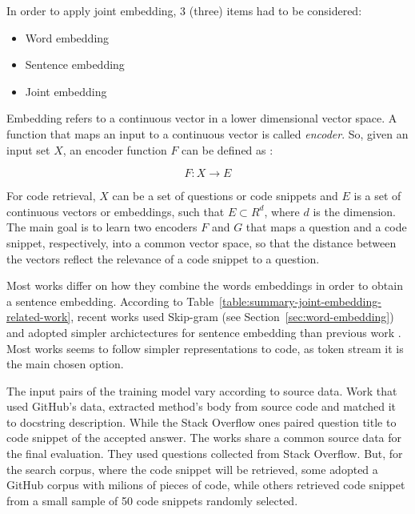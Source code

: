 \documentclass[sigconf]{acmart}
\begin{document}
In order to apply joint embedding, 3 (three) items had to be considered:

\begin{itemize}
    \item Word embedding
    \item Sentence embedding
    \item Joint embedding
\end{itemize}

Embedding refers to a continuous vector in a lower dimensional vector space. A function that maps an input to a continuous vector is called \emph{encoder}. So, given an input set $X$, an encoder function $F$ can be defined as \cite{cambronero-deep-code-search-2019}:

\begin{equation}
    F: X \to E
\end{equation}

For code retrieval, $X$ can be a set of questions or code snippets and $E$ is a set of continuous vectors or embeddings, such that $E \subset R^{d}$, where $d$ is the dimension. The main goal is to learn two encoders $F$ and $G$ that maps a question and a code snippet, respectively, into a common vector space, so that the distance between the vectors reflect the relevance of a code snippet to a question.

Most works differ on how they combine the words embeddings in order to obtain a sentence embedding. According to Table~\ref{table:summary-joint-embedding-related-work}, recent works \cite{Sachdev-neural-code-search:2018, cambronero-deep-code-search-2019} used Skip-gram (see Section~\ref{sec:word-embedding}) and adopted simpler archictectures for sentence embedding than previous work \cite{Gu-deep-code-search:2018, Chen-bi-variational-autoencoder:2018}. Most works seems to follow simpler representations to code, as token stream it is the main chosen option. 

The input pairs of the training model vary according to source data. Work \cite{Gu-deep-code-search:2018, Sachdev-neural-code-search:2018, cambronero-deep-code-search-2019} that used GitHub's data, extracted method's body from source code and matched it to docstring description. While the Stack Overflow ones \cite{Allamanis-bimodal-source-code-natural-language:2015, Chen-bi-variational-autoencoder:2018, iyer-etal-2016-summarizing} paired question title to code snippet of the accepted answer. The works share a common source data for the final evaluation. They used questions collected from Stack Overflow. But, for the search corpus, where the code snippet will be retrieved, some \cite{Gu-deep-code-search:2018, Sachdev-neural-code-search:2018, cambronero-deep-code-search-2019} adopted a GitHub corpus with milions of pieces of code, while others \cite{Allamanis-bimodal-source-code-natural-language:2015, iyer-etal-2016-summarizing, Chen-bi-variational-autoencoder:2018} retrieved code snippet from a small sample of 50 code snippets randomly selected.
\end{document}
